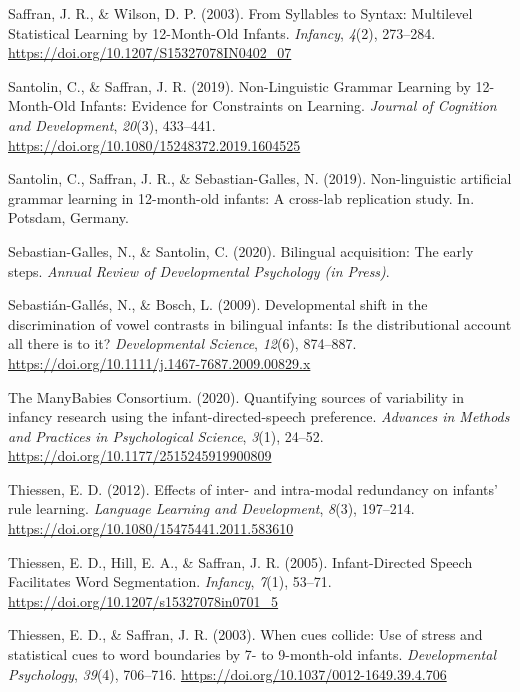\documentclass[english,man,man,floatsintext]{apa6}
\begin{document}
\leavevmode\hypertarget{ref-saffran2003}{}%
Saffran, J. R., \& Wilson, D. P. (2003). From Syllables to Syntax: Multilevel Statistical Learning by 12-Month-Old Infants. \emph{Infancy}, \emph{4}(2), 273--284. \url{https://doi.org/10.1207/S15327078IN0402_07}

\leavevmode\hypertarget{ref-santolin2019}{}%
Santolin, C., \& Saffran, J. R. (2019). Non-Linguistic Grammar Learning by 12-Month-Old Infants: Evidence for Constraints on Learning. \emph{Journal of Cognition and Development}, \emph{20}(3), 433--441. \url{https://doi.org/10.1080/15248372.2019.1604525}

\leavevmode\hypertarget{ref-santolin2019a}{}%
Santolin, C., Saffran, J. R., \& Sebastian-Galles, N. (2019). Non-linguistic artificial grammar learning in 12-month-old infants: A cross-lab replication study. In. Potsdam, Germany.

\leavevmode\hypertarget{ref-sebastian-galles2020}{}%
Sebastian-Galles, N., \& Santolin, C. (2020). Bilingual acquisition: The early steps. \emph{Annual Review of Developmental Psychology (in Press)}.

\leavevmode\hypertarget{ref-sebastian-galles2009}{}%
Sebastián-Gallés, N., \& Bosch, L. (2009). Developmental shift in the discrimination of vowel contrasts in bilingual infants: Is the distributional account all there is to it? \emph{Developmental Science}, \emph{12}(6), 874--887. \url{https://doi.org/10.1111/j.1467-7687.2009.00829.x}

\leavevmode\hypertarget{ref-many-babies2020}{}%
The ManyBabies Consortium. (2020). Quantifying sources of variability in infancy research using the infant-directed-speech preference. \emph{Advances in Methods and Practices in Psychological Science}, \emph{3}(1), 24--52. \url{https://doi.org/10.1177/2515245919900809}

\leavevmode\hypertarget{ref-thiessen2012}{}%
Thiessen, E. D. (2012). Effects of inter- and intra-modal redundancy on infants' rule learning. \emph{Language Learning and Development}, \emph{8}(3), 197--214. \url{https://doi.org/10.1080/15475441.2011.583610}

\leavevmode\hypertarget{ref-thiessen2005}{}%
Thiessen, E. D., Hill, E. A., \& Saffran, J. R. (2005). Infant-Directed Speech Facilitates Word Segmentation. \emph{Infancy}, \emph{7}(1), 53--71. \url{https://doi.org/10.1207/s15327078in0701_5}

\leavevmode\hypertarget{ref-thiessen2003}{}%
Thiessen, E. D., \& Saffran, J. R. (2003). When cues collide: Use of stress and statistical cues to word boundaries by 7- to 9-month-old infants. \emph{Developmental Psychology}, \emph{39}(4), 706--716. \url{https://doi.org/10.1037/0012-1649.39.4.706}
\end{document}
